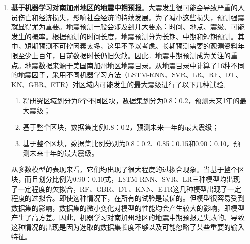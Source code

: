\begin{enumerate}
    \item \textbf{基于机器学习对南加州地区的地震中期预报}。大震发生很可能会导致严重的人员伤亡和经济损失，影响社会经济的持续发展。为了减小这些损失，预测强震就显得尤为重要。地震预测一般会涉及到几大要素：时间、地点、震级、可能发生的概率。根据预测的时间长度，地震预测分为长期、中期和短期预测。其中，短期预测不可控因素太多，这里不予以考虑。长期预测需要的观测资料年限至少上百年，目前数据时长仍旧欠缺。因此，地震中期预测成为关注的重点。地震数据来源于美国南加州地区地震目录。从地震目录中计算了16种不同的地震因子，采用不同机器学习方法（LSTM-RNN、SVR、LR、RF、DT、KN、GBR、ETR）对区域内可能发生的最大震级进行了以下几种试验。
    \begin{enumerate}
      \item 将研究区域划分为6个不同区块，数据集划分为0.8：0.2，预测未来1年的最大震级；
      \item 基于整个区块，数据集比例0.8：0.2，预测未来一年的最大震级；
      \item 基于整个区块，数据集比例分别为0.8：0.2、0.85：0.15和0.90：0.10，预测未来十年的最大震级。
    \end{enumerate}
    
    从多数模型的表现来看，它们均出现了很大程度的过拟合现象。当基于整个区块，而且划分比例为0.90：0.10式，LSTM-RNN、SVR、LR三种模型均出现了一定程度的欠拟合，RF、GBR、DT、KNN、ETR这几种模型出现了一定程度的过拟合。即使这种情况下，在所有的试验是最优的。但模型很容易受到数据集的影响，数据集的微小变化对模型的性能均会产生较大的影响，即模型产生了高方差。因此，机器学习对南加州地区的地震中期预报是失败的。导致这种情况的出现是因为选取的数据集长度不够以及可能忽略了某些重要的输入特征。

\end{enumerate}